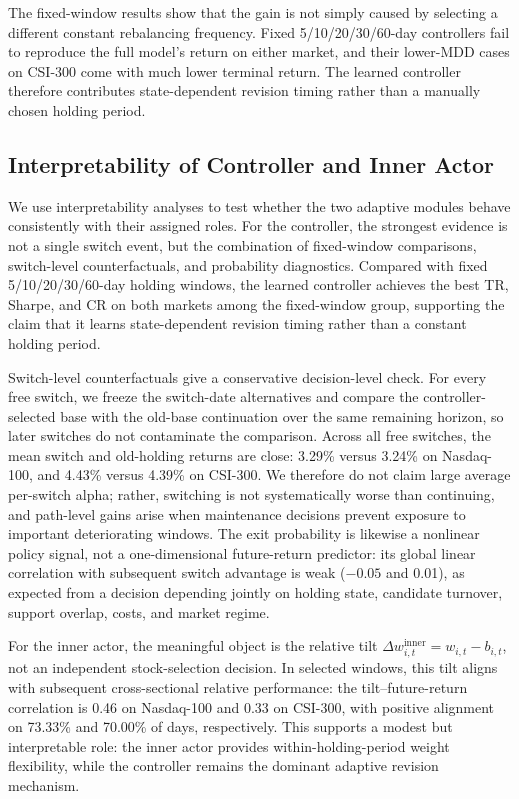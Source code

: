 \documentclass[letterpaper]{article} %
\begin{document}
The fixed-window results show that the gain is not simply caused by selecting a different constant rebalancing frequency. Fixed 5/10/20/30/60-day controllers fail to reproduce the full model's return on either market, and their lower-MDD cases on CSI-300 come with much lower terminal return. The learned controller therefore contributes state-dependent revision timing rather than a manually chosen holding period.

\subsection{Interpretability of Controller and Inner Actor}

We use interpretability analyses to test whether the two adaptive modules behave consistently with their assigned roles. For the controller, the strongest evidence is not a single switch event, but the combination of fixed-window comparisons, switch-level counterfactuals, and probability diagnostics. Compared with fixed 5/10/20/30/60-day holding windows, the learned controller achieves the best TR, Sharpe, and CR on both markets among the fixed-window group, supporting the claim that it learns state-dependent revision timing rather than a constant holding period.

Switch-level counterfactuals give a conservative decision-level check. For every free switch, we freeze the switch-date alternatives and compare the controller-selected base with the old-base continuation over the same remaining horizon, so later switches do not contaminate the comparison. Across all free switches, the mean switch and old-holding returns are close: 3.29\% versus 3.24\% on Nasdaq-100, and 4.43\% versus 4.39\% on CSI-300. We therefore do not claim large average per-switch alpha; rather, switching is not systematically worse than continuing, and path-level gains arise when maintenance decisions prevent exposure to important deteriorating windows. The exit probability is likewise a nonlinear policy signal, not a one-dimensional future-return predictor: its global linear correlation with subsequent switch advantage is weak (\(-0.05\) and 0.01), as expected from a decision depending jointly on holding state, candidate turnover, support overlap, costs, and market regime.

For the inner actor, the meaningful object is the relative tilt \(\Delta w_{i,t}^{\mathrm{inner}}=w_{i,t}-b_{i,t}\), not an independent stock-selection decision. In selected windows, this tilt aligns with subsequent cross-sectional relative performance: the tilt--future-return correlation is 0.46 on Nasdaq-100 and 0.33 on CSI-300, with positive alignment on 73.33\% and 70.00\% of days, respectively. This supports a modest but interpretable role: the inner actor provides within-holding-period weight flexibility, while the controller remains the dominant adaptive revision mechanism.
\end{document}
